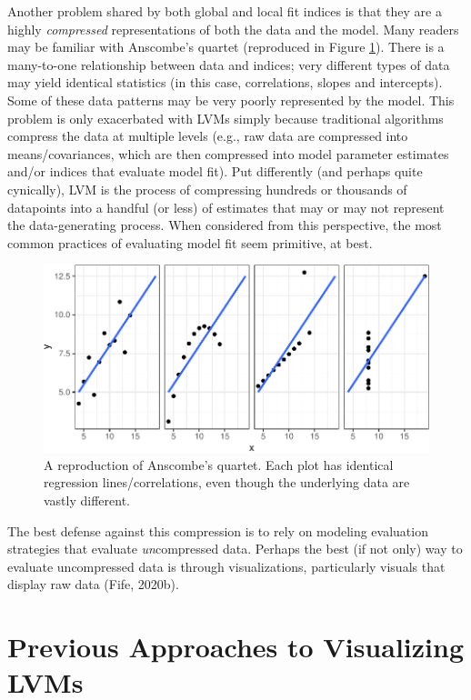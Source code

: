 \documentclass[
  english,
  doc]{apa6}
\begin{document}
Another problem shared by both global and local fit indices is that they are a highly \emph{compressed} representations of both the data and the model. Many readers may be familiar with Anscombe's quartet (reproduced in Figure \ref{fig:anscombe}). There is a many-to-one relationship between data and indices; very different types of data may yield identical statistics (in this case, correlations, slopes and intercepts). Some of these data patterns may be very poorly represented by the model. This problem is only exacerbated with LVMs simply because traditional algorithms compress the data at multiple levels (e.g., raw data are compressed into means/covariances, which are then compressed into model parameter estimates and/or indices that evaluate model fit). Put differently (and perhaps quite cynically), LVM is the process of compressing hundreds or thousands of datapoints into a handful (or less) of estimates that may or may not represent the data-generating process. When considered from this perspective, the most common practices of evaluating model fit seem primitive, at best.

\begin{figure}
\centering
\includegraphics{flexplavaan_draft_files/figure-latex/anscombe-1.pdf}
\caption{\label{fig:anscombe}A reproduction of Anscombe's quartet. Each plot has identical regression lines/correlations, even though the underlying data are vastly different.}
\end{figure}

The best defense against this compression is to rely on modeling evaluation strategies that evaluate \emph{un}compressed data. Perhaps the best (if not only) way to evaluate uncompressed data is through visualizations, particularly visuals that display raw data (Fife, 2020b).

\hypertarget{previous-approaches-to-visualizing-lvms}{%
\section{Previous Approaches to Visualizing LVMs}\label{previous-approaches-to-visualizing-lvms}}
\end{document}
